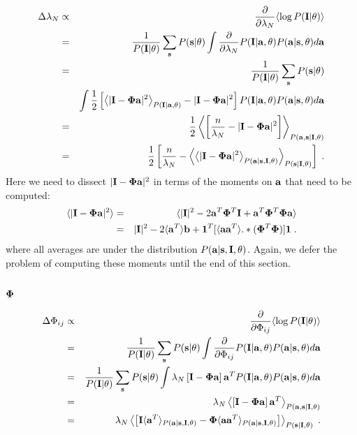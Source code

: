 \documentclass[12pt]{article}
\newcommand{\params}{\theta}
\newcommand{\ba}{{\bf a}}
\newcommand{\bs}{{\bf s}}
\newcommand{\bI}{{\bf I}}
\newcommand{\bPhi}{{\bf \Phi}}
\newcommand{\bb}{{\bf b}}
\newcommand{\bone}{{\bf 1}}
\newcommand{\pd}[1]{\frac{\partial}{\partial #1}}
\begin{document}
\begin{eqnarray}
\Delta \lambda_N & \propto &
   \pd{\lambda_N} \langle \log P(\bI|\params) \rangle \\
 & = & \frac{1}{P(\bI|\params)} \sum_{\bs} P(\bs|\params) 
        \int \pd{\lambda_N} P(\bI|\ba,\params) 
              P(\ba|\bs,\params) d\ba \\
 & = & \frac{1}{P(\bI|\params)} \sum_{\bs} P(\bs|\params) \\
 &   & \int \frac{1}{2} \left[ \left\langle |\bI-\bPhi\ba|^2 
              \right\rangle_{P(\bI|\ba,\params)}
                              - |\bI-\bPhi\ba|^2 \right] 
             P(\bI|\ba,\params) P(\ba|\bs,\params) d\ba \\
 & = & \frac{1}{2} \left\langle \left[ \frac{n}{\lambda_N} 
                                       - |\bI-\bPhi\ba|^2 \right]
                   \right\rangle_{P(\ba,\bs|\bI,\params)} \\
 & = & \frac{1}{2} \left[ \frac{n}{\lambda_N} - 
         \left\langle \left\langle |\bI-\bPhi\ba|^2 
                      \right\rangle_{P(\ba|\bs,\bI,\params)}
         \right\rangle_{P(\bs|\bI,\params)} \right] \; .
\end{eqnarray}
Here we need to dissect $|\bI-\bPhi\ba|^2$ in terms of the moments on
$\ba$ that need to be computed:
\begin{eqnarray}
\langle |\bI-\bPhi\ba|^2 \rangle & = & 
  \langle |\bI|^2 - 2\ba^T\bPhi^T\bI + \ba^T\bPhi^T\bPhi\ba \rangle \\
 & = & |\bI|^2 - 2\langle\ba^T\rangle\bb + 
       \bone^T[\langle\ba\ba^T\rangle.*(\bPhi^T\bPhi)]\bone  \; .
\end{eqnarray}
where all averages are under the distribution
$P(\ba|\bs,\bI,\params)$.  Again, we defer the problem of computing
these moments until the end of this section.


\subsection{$\bPhi$}

\begin{eqnarray}
\Delta \Phi_{ij} & \propto &
   \pd{\Phi_{ij}} \langle \log P(\bI|\params) \rangle \\
 & = & \frac{1}{P(\bI|\params)} \sum_{\bs} P(\bs|\params) 
        \int \pd{\Phi_{ij}} P(\bI|\ba,\params) 
              P(\ba|\bs,\params) d\ba \\
 & = & \frac{1}{P(\bI|\params)} \sum_{\bs} P(\bs|\params)
        \int \lambda_N \left[\bI-\bPhi\ba \right]\ba^T
             P(\bI|\ba,\params) P(\ba|\bs,\params) d\ba \\
 & = & \lambda_N \left\langle \left[\bI -\bPhi\ba \right] \ba^T
                 \right\rangle_{P(\ba,\bs|\bI,\params)} \\
 & = & \lambda_N \left\langle 
                  \left[ \bI\langle\ba^T\rangle_{P(\ba|\bs,\bI,\params)}
                        - \bPhi\langle\ba\ba^T\rangle_{ P(\ba|\bs,\bI,\params)}
                  \right] \right\rangle_{P(\bs|\bI,\params)} \; .
\end{eqnarray}
\end{document}

